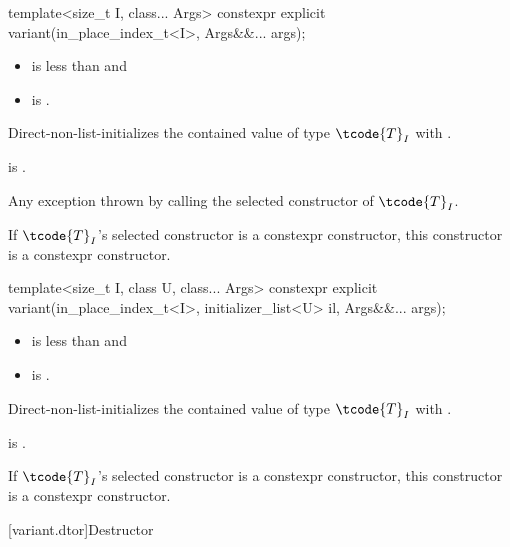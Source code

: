 %
\begin{itemdecl}
template<size_t I, class... Args> constexpr explicit variant(in_place_index_t<I>, Args&&... args);
\end{itemdecl}

\begin{itemdescr}
\pnum
\constraints
\begin{itemize}
\item
{} is less than  and
\item
{} is .
\end{itemize}

\pnum
\effects
Direct-non-list-initializes the contained value of type $\tcode{T}_I$
with .

\pnum
\ensures
{} is .

\pnum
\throws
Any exception thrown by calling the selected constructor of $\tcode{T}_I$.

\pnum
\remarks
If $\tcode{T}_I$'s selected constructor is a constexpr constructor, this
constructor is a constexpr constructor.
\end{itemdescr}

%
\begin{itemdecl}
template<size_t I, class U, class... Args>
  constexpr explicit variant(in_place_index_t<I>, initializer_list<U> il, Args&&... args);
\end{itemdecl}

\begin{itemdescr}
\pnum
\constraints
\begin{itemize}
\item
{} is less than  and
\item
{} is .
\end{itemize}

\pnum
\effects
Direct-non-list-initializes the contained value of type $\tcode{T}_I$
with .

\pnum
\ensures
{} is .

\pnum
\remarks
If $\tcode{T}_I$'s selected constructor is a constexpr constructor, this
constructor is a constexpr constructor.
\end{itemdescr}

[variant.dtor]{Destructor}

